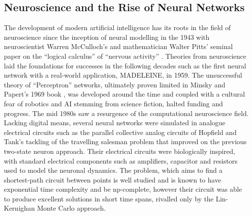 \documentclass[11pt, twocolumn]{article}
\begin{document}
\subsection*{Neuroscience and the Rise of Neural Networks}
The development of modern artificial intelligence has its roots in the field of neuroscience since the inception of neural modelling in the 1943 with neuroscientist Warren McCulloch's and mathematician Walter Pitts' seminal paper on the ``logical calculus'' of ``nervous activity'' \cite{mcculloch1943logical}. Theories from neuroscience laid the foundations for successes in the following decades such as the first neural network with a real-world application, MADELEINE, in 1959. The unsuccessful theory of ``Perceptron'' networks, ultimately proven limited in Minsky and Papert's 1969 book \cite{minsky1969perceptron}, was developed around the time and coupled with a cultural fear of robotics and AI stemming from science fiction, halted funding and progress. The mid 1980s saw a resurgence of the computational neuroscience field. Lacking digital means, several neural networks were simulated in analogue electrical circuits such as the parallel collective analog circuits of Hopfield and Tank's tackling of the travelling salesman problem \cite{hopfield1985neural} that improved on the previous two-state neuron approach. Their electrical circuits were biologically inspired, with standard electrical components such as amplifiers, capacitor and resistors used to model the neuronal dynamics. The problem, which aims to find a shortest-path circuit between points is well studied and is known to have exponential time complexity and be np-complete, however their circuit was able to produce excellent solutions in short time spans, rivalled only by the Lin-Kernighan Monte Carlo approach.
\end{document}
